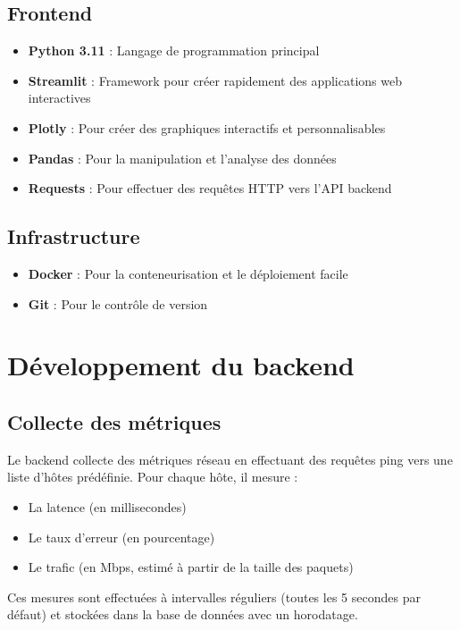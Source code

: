 \documentclass[12pt,a4paper]{report}
\begin{document}
\subsection{Frontend}
\begin{itemize}
    \item \textbf{Python 3.11} : Langage de programmation principal
    \item \textbf{Streamlit} : Framework pour créer rapidement des applications web interactives
    \item \textbf{Plotly} : Pour créer des graphiques interactifs et personnalisables
    \item \textbf{Pandas} : Pour la manipulation et l'analyse des données
    \item \textbf{Requests} : Pour effectuer des requêtes HTTP vers l'API backend
\end{itemize}

\subsection{Infrastructure}
\begin{itemize}
    \item \textbf{Docker} : Pour la conteneurisation et le déploiement facile
    \item \textbf{Git} : Pour le contrôle de version
\end{itemize}

\section{Développement du backend}
\subsection{Collecte des métriques}
Le backend collecte des métriques réseau en effectuant des requêtes ping vers une liste d'hôtes prédéfinie. Pour chaque hôte, il mesure :
\begin{itemize}
    \item La latence (en millisecondes)
    \item Le taux d'erreur (en pourcentage)
    \item Le trafic (en Mbps, estimé à partir de la taille des paquets)
\end{itemize}
Ces mesures sont effectuées à intervalles réguliers (toutes les 5 secondes par défaut) et stockées dans la base de données avec un horodatage.
\end{document}
